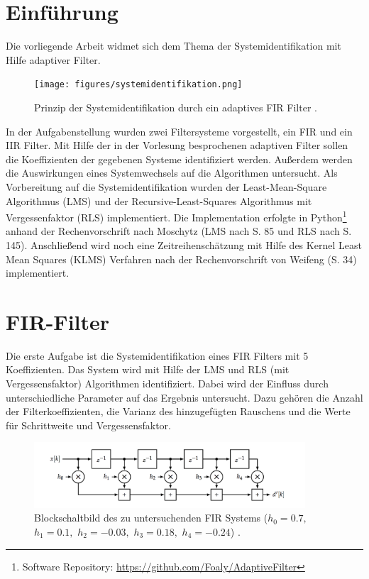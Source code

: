 \section{Einführung}
\label{sec:intor}

Die vorliegende Arbeit widmet sich dem Thema der Systemidentifikation mit Hilfe adaptiver Filter.

\begin{figure}[H]
  \centering
  \texttt{[image: figures/systemidentifikation.png]}
  \caption{Prinzip der Systemidentifikation durch ein adaptives FIR Filter \cite{moschytz2000book}.}
  \label{fig:Systemidentifikation}
\end{figure}

In der Aufgabenstellung \cite{aufgabenstellung} wurden zwei Filtersysteme vorgestellt, ein FIR und ein IIR Filter.
Mit Hilfe der in der Vorlesung besprochenen adaptiven Filter sollen die Koeffizienten der gegebenen Systeme identifiziert werden.
Außerdem werden die Auswirkungen eines Systemwechsels auf die Algorithmen untersucht.
Als Vorbereitung auf die Systemidentifikation wurden der Least-Mean-Square Algorithmus (LMS) und der Recursive-Least-Squares Algorithmus mit Vergessenfaktor (RLS) implementiert.
Die Implementation erfolgte in Python\footnote{Software Repository: \url{https://github.com/Foaly/AdaptiveFilter}} anhand der Rechenvorschrift nach Moschytz \cite{moschytz2000book} (LMS nach S. 85 und RLS nach S. 145).
Anschließend wird noch eine Zeitreihenschätzung mit Hilfe des Kernel Least Mean Squares (KLMS) Verfahren nach der Rechenvorschrift von Weifeng \cite{weifeng2010} (S. 34) implementiert.

\section{FIR-Filter}
\label{sec:fir}

Die erste Aufgabe ist die Systemidentifikation eines FIR Filters mit 5 Koeffizienten.
Das System wird mit Hilfe der LMS und RLS (mit Vergessensfaktor) Algorithmen identifiziert.
Dabei wird der Einfluss durch unterschiedliche Parameter auf das Ergebnis untersucht.
Dazu gehören die Anzahl der Filterkoeffizienten, die Varianz des hinzugefügten Rauschens und die Werte für Schrittweite und Vergessensfaktor.

\begin{figure}[H]
  \centering
      \includegraphics[width=0.9\textwidth]{figures/FIR_System.png}
 \caption{Blockschaltbild des zu untersuchenden FIR Systems (${h_0 = 0.7,}$ ${h_1 = 0.1,}$ ${h_2 = -0.03,}$ ${h_3 = 0.18,}$ ${h_4 = -0.24}$) \cite{aufgabenstellung}.}
	\label{fig:FIR_System}
\end{figure}

